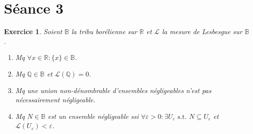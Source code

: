 \documentclass{article}
\newtheorem{ex}{Exercice}[section]
\theoremstyle{definition}
\newcommand{\st}{\text{ s.t. }}
\newcommand{\Q}{{\mathbb Q}}
\newcommand{\R}{{\mathbb R}}
\newcommand{\B}{{\mathbb B}}
\begin{document}
\newpage
\section{Séance 3}
\begin{ex} Soient $\B$ la tribu borélienne sur $\R$ et $\mathcal L$ la mesure de Lesbesgue sur $\B$.
\begin{enumerate}
	\item Mq $\forall x \in \R : \{x\} \in \B$.
	\item Mq $\Q \in \B$ et $\mathcal L(\Q) = 0$.
	\item Mq une union non-dénombrable d'ensembles négligeables n'est pas nécessairement négligeable.
	\item Mq $N \in \B$ est un ensemble négligeable ssi $\forall \varepsilon > 0 : \exists U_\varepsilon \st N \subseteq U_\varepsilon$ et $\mathcal L(U_\varepsilon) < \varepsilon$.
\end{enumerate}
\end{ex}
\end{document}
